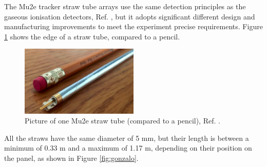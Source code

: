 The Mu2e tracker straw tube arrays use the same detection principles as the gaseous 
ionisation detectors, Ref. \cite{kola}, 
but it adopts significant different design and manufacturing improvements to 
meet the experiment precise requirements.
Figure \ref{fig:trkpencil} shows the edge of a straw tube, compared to a pencil.
\begin{figure}[!h]
    \centering
    \includegraphics[width =0.5\textwidth]{figures/png/Screenshot_20240327_000000.png}
    \caption{Picture of one Mu2e straw tube (compared to a pencil), Ref. \cite{trk}.}
    \label{fig:trkpencil}
    \end{figure}


All the straws have the same diameter of 5 mm, but their length 
is between a minimum of 0.33 m and a maximum of 1.17 m, 
depending on their position on the panel, as shown in Figure \ref{fig:gonzalo}.


